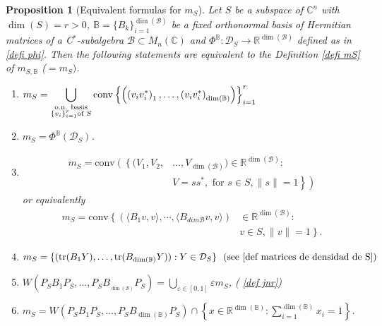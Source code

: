 \documentclass[12pt,a4paper]{article}
\def\calB{\mathcal B}
\def\calD{\mathcal D}
\def\R{\mathbb R}
\def\C{\mathbb C}
\def\tr{\text{tr}}
\newtheorem{proposition}{Proposition}
\numberwithin{equation}{section}
\begin{document}
\begin{proposition}[Equivalent formulas for $m_S$] \label{prop 1}
 	Let $S$ be a subspace of $\C^n$ with $\dim(S)=r>0$, $\mathbb{B}=\{B_k\}_{i=1}^{\dim(\calB)}$ be a fixed orthonormal basis of Hermitian matrices of a C$^*$-subalgebra $\calB\subset M_n(\C)$ and  $\Phi^{\mathbb{B}}:\calD_{S}\to\R^{\dim(\calB)}$ defined as in \eqref{defi phi}. Then the following statements are equivalent to the Definition  \ref{defi mS} of $m_{S,\mathbb{B}}$ ($=m_S)$.
% 	
	\begin{enumerate}
			\item \label{item3Prop1}
		$\displaystyle{
			m_S=\mathop{\bigcup}\limits_{\substack{\text{o.n. basis}  \\
					\{v_i\}_{i=1}^{r} \text{of } S}}
			{\rm conv}\left\{ \left(\left(v_i v_i^*\right)_1,\dots, \left(v_i v_i^*\right)_{\dim(\mathbb{B})} \right)  \right\}_{i=1}^{r}
		}$
		\item \label{mS = diag DsubS} $m_S= \Phi^{\mathbb{B}}(\calD_{S})$.
		\item \label{item2Prop1} 		
		\begin{equation*}
			\begin{split}
				m_S=\text{conv}\left(\left\{(V_1,V_2,\right.\right.&\left.\left.\dots,V_{\dim(\calB)})\right.\right.\in\R^{\dim(\calB)}:\\
				&\left.\left.V=s s^*, \text{ for } s\in S, \|s\|=1  \right\} \right)
			\end{split}
		\end{equation*}
		or equivalently
		\begin{equation}\label{eq momento}
			\begin{split}
			m_S=\text{conv}\left\{\left(\langle B_1v,v\rangle, \cdots, \langle B_{dim \calB}v,v\rangle\right)
			\right. 
			& \in\R^{\dim(\calB)}: \\
			 & \left. v\in S, \|v\|=1 \right\}.		
			\end{split}
		\end{equation}
	
		\item \label{item4Prop1}
		$\displaystyle{
		m_S=\{(\tr(B_1Y),\dots,\tr(B_{\dim(\mathbb{B})} Y)): Y\in \mathcal{D}_S\} \ \ \text{(see \eqref{def matrices de densidad de S})}
			}$
		\item \label{item5Prop1}
		$
		\displaystyle{
		W(P_SB_1P_S,\dots,P_SB_{_{\dim(\calB)}}P_S)=\bigcup_{\varepsilon\in[0,1]} \varepsilon m_S}$, ( \eqref{def jnr})
		
		\item \label{item6Prop1}
		$\displaystyle{
		m_S=W(P_SB_1P_S,\dots,P_SB_{{\dim(\mathbb{B})}}P_S)\cap \left\{ x\in \mathbb{R}^{{\dim(\mathbb{B})}}: \sum_{i=1}^{\dim(\mathbb{B})} x_i=1 \right\}
		}$.
	\end{enumerate}
\end{proposition}
\end{document}
